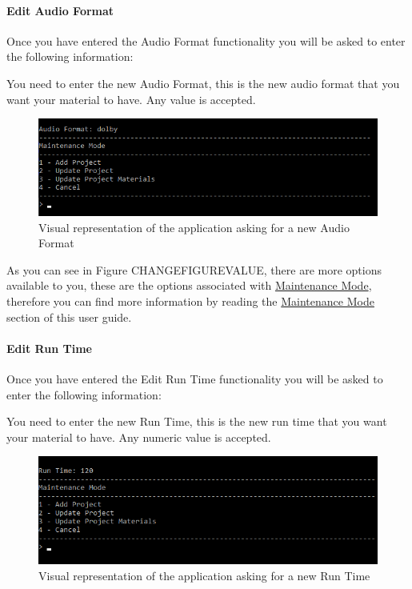 \documentclass[
  english,
  a4paper,
,tablecaptionabove
]{scrartcl}
\begin{document}
\newpage

\hypertarget{edit-audio-format}{%
\paragraph{Edit Audio Format}\label{edit-audio-format}}

Once you have entered the Audio Format functionality you will be asked
to enter the following information:

You need to enter the new Audio Format, this is the new audio format
that you want your material to have. Any value is accepted.

\begin{figure}
\centering
\includegraphics{images/user-guide/maintenance-mode/update-project-material-audio-format.png}
\caption{Visual representation of the application asking for a new Audio
Format}
\end{figure}

As you can see in Figure CHANGEFIGUREVALUE, there are more options
available to you, these are the options associated with
\protect\hyperlink{using-maintenance-mode}{Maintenance Mode}, therefore
you can find more information by reading the
\protect\hyperlink{using-maintenance-mode}{Maintenance Mode} section of
this user guide.

\newpage

\hypertarget{edit-run-time}{%
\paragraph{Edit Run Time}\label{edit-run-time}}

Once you have entered the Edit Run Time functionality you will be asked
to enter the following information:

You need to enter the new Run Time, this is the new run time that you
want your material to have. Any numeric value is accepted.

\begin{figure}
\centering
\includegraphics{images/user-guide/maintenance-mode/update-project-material-run-time.png}
\caption{Visual representation of the application asking for a new Run
Time}
\end{figure}
\end{document}
